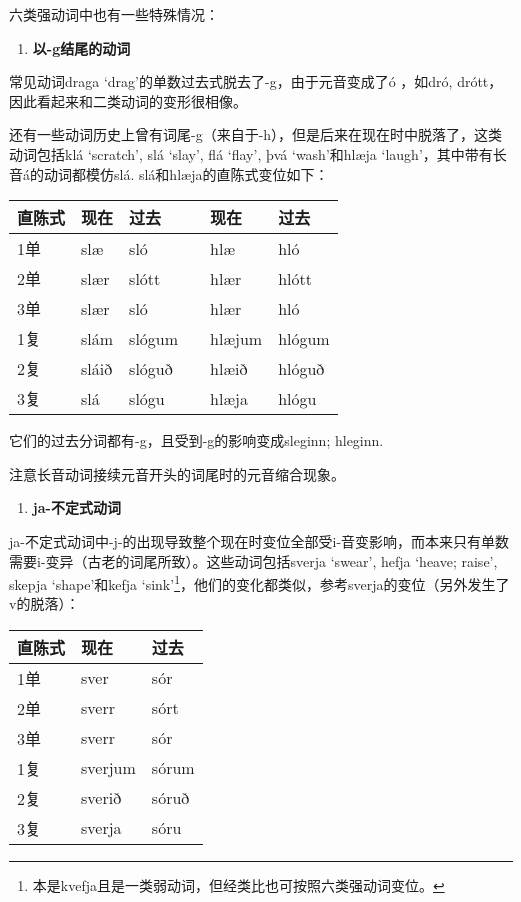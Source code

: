 六类强动词中也有一些特殊情况：

\begin{enumerate}
  \def\labelenumi{\arabic{enumi})}
  \item
        \textbf{以-g结尾的动词}
\end{enumerate}

常见动词draga `drag‌'的单数过去式脱去了-g，由于元音变成了ó ，如dró,
drótt，因此看起来和二类动词的变形很相像。

还有一些动词历史上曾有词尾-g（来自于-h），但是后来在现在时中脱落了，这类动词包括klá
`scratch', slá `slay', flá `flay', þvá `wash'和hlæja
`laugh‌'，其中带有长音á的动词都模仿slá. slá和hlæja的直陈式变位如下：

\begin{longtable}{llllll}
  \toprule
  直陈式 & 现在    & 过去     &  & 现在     & 过去     \\
  \midrule
  \endhead
  \bottomrule
  \endfoot
  1单  & slæ   & sló    &  & hlæ    & hló    \\
  2单  & slær  & slótt  &  & hlær   & hlótt  \\
  3单  & slær  & sló    &  & hlær   & hló    \\
  1复  & slám  & slógum &  & hlæjum & hlógum \\
  2复  & sláið & slóguð &  & hlæið  & hlóguð \\
  3复  & slá   & slógu  &  & hlæja  & hlógu  \\
\end{longtable}

它们的过去分词都有-g，且受到-g的影响变成sleginn; hleginn.

注意长音动词接续元音开头的词尾时的元音缩合现象。

\begin{enumerate}
  \def\labelenumi{\arabic{enumi})}
  \setcounter{enumi}{1}
  \item
        \textbf{ja-不定式动词}
\end{enumerate}

ja-不定式动词中-j-的出现导致整个现在时变位全部受i-音变影响，而本来只有单数需要i-变异（古老的词尾所致）。这些动词包括sverja
`swear', hefja `heave; raise', skepja `shape'和kefja
`sink'\footnote{本是kvefja且是一类弱动词，但经类比也可按照六类强动词变位。}，他们的变化都类似，参考sverja的变位（另外发生了v的脱落）：

\begin{longtable}{lll}
  \toprule
  直陈式 & 现在      & 过去    \\
  \midrule
  \endhead
  \bottomrule
  \endfoot
  1单  & sver    & sór   \\
  2单  & sverr   & sórt  \\
  3单  & sverr   & sór   \\
  1复  & sverjum & sórum \\
  2复  & sverið  & sóruð \\
  3复  & sverja  & sóru  \\
\end{longtable}

